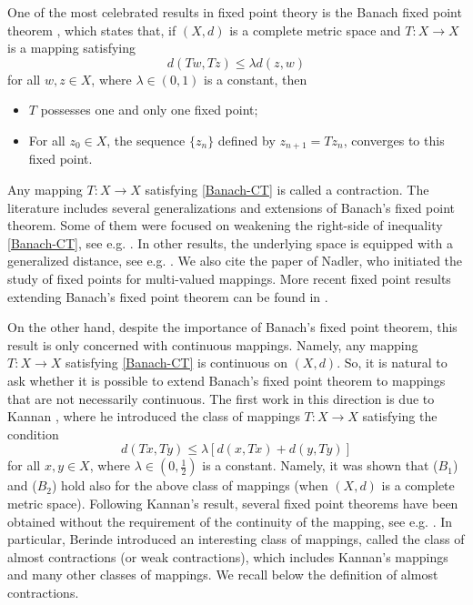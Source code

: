 \documentclass[letterpaper,12pt]{article}
\numberwithin{equation}{section}
\theoremstyle{definition}
\theoremstyle{remark}
\begin{document}
One of the most celebrated results in fixed point theory is the Banach fixed point theorem \cite{Banach}, which states that, if   $(X,d)$ is a complete metric space and $T: X\to X$ is a mapping  satisfying
\begin{equation}\label{Banach-CT}
d(Tw,Tz)\leq \lambda d(z,w)	
\end{equation}
for all $w,z\in X$, where $\lambda\in (0,1)$ is a constant, then 
\begin{itemize}
\item[($B_1$)] $T$ 	possesses one and only one fixed point;
\item[($B_2$)]For all $z_0\in X$, the sequence $\{z_n\}$ defined by $z_{n+1}=Tz_n$, converges to this fixed point. 
\end{itemize}
Any mapping $T: X\to X$ satisfying \eqref{Banach-CT} is called a contraction. The literature includes several generalizations and extensions of Banach's fixed point theorem.  Some of them were focused on weakening the right-side of inequality \eqref{Banach-CT}, see e.g. \cite{Berinde1,BO,Ciric,KH,RA,RE,Rus,Zhang}.  In other results, the underlying space is equipped with a generalized distance, see e.g. \cite{Branciari,CZ,DH,JS,Mustafa}. We also cite  the paper \cite{Nadler} of Nadler, who initiated the study of fixed points for 
multi-valued mappings. More recent fixed point results extending Banach's fixed point theorem can be found in \cite{AG,Berinde-20,Berinde4,PA2,Petrov,PE,Popescu,OZ}. 

On the other hand, despite the importance of Banach's fixed point theorem, this result is only concerned with continuous mappings. Namely, any mapping $T: X\to X$ satisfying \eqref{Banach-CT} is continuous on $(X,d)$. So, it is natural to ask whether it is possible to extend Banach's fixed point theorem to  mappings that are not necessarily continuous. The first work in this direction is due to  Kannan \cite{KAN}, where he introduced the class of mappings $T: X\to X$ satisfying the condition
$$
d(Tx,Ty)\leq \lambda \left[d(x,Tx)+d(y,Ty)\right]
$$
for all $x,y\in X$, where $\lambda\in \left(0,\frac{1}{2}\right)$ is a constant. Namely, it was shown that ($B_1$) and ($B_2$) hold also for the above class of mappings (when $(X,d)$ is a complete metric space). Following Kannan's result, several fixed point theorems have been  obtained without the requirement of the continuity of the mapping, see e.g. \cite{Berinde1,Berinde-08,Berinde3,CH,Ciric,RE}. In particular, Berinde \cite{Berinde1} introduced an interesting class of mappings, called the class of almost contractions (or weak contractions), which includes Kannan's mappings and many other classes of mappings. We recall below the definition of almost contractions. 
\end{document}
